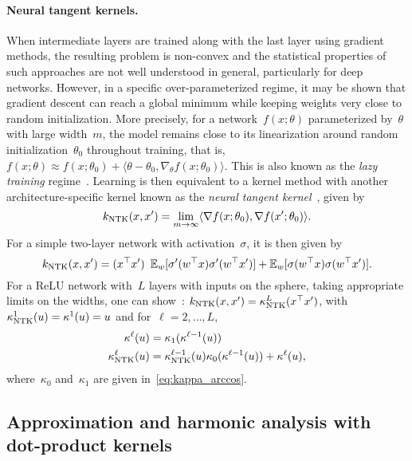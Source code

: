\paragraph{Neural tangent kernels.}
When intermediate layers are trained along with the last layer using gradient methods, the resulting problem is non-convex and the statistical properties of such approaches are not well understood in general, particularly for deep networks.
However, in a specific over-parameterized regime, it may be shown that gradient descent can reach a global minimum while keeping weights very close to random initialization.
More precisely,
for a network~$f(x; \theta)$ parameterized by~$\theta$ with large width~$m$, the model remains close to its linearization around random initialization~$\theta_0$ throughout training, that is,~$f(x; \theta) \approx f(x; \theta_0) + \langle \theta - \theta_0, \nabla_\theta f(x; \theta_0) \rangle$.
This is also known as the \emph{lazy training} regime~\citep{chizat2018note}.
Learning is then equivalent to a kernel method with another architecture-specific kernel known as the \emph{neural tangent kernel}~\citep[NTK,][]{jacot2018neural}, given by
\begin{equation}
k_{{\text{NTK}}}(x, x') = \lim_{m \to \infty} \langle \nabla f(x; \theta_0), \nabla f(x'; \theta_0) \rangle.
\end{equation}
For a simple two-layer network with activation~$\sigma$, it is then given by
\begin{equation}
k_{{\text{NTK}}}(x, x') = (x^\top x') ~\operatorname{\mathbb{E}}_w [\sigma'(w^\top x) \sigma'(w^\top x')] + \operatorname{\mathbb{E}}_w [\sigma(w^\top x) \sigma(w^\top x')].
\end{equation}
For a ReLU network with~$L$ layers with inputs on the sphere, taking appropriate limits on the widths, one can show~\citep{jacot2018neural}: $k_{{\text{NTK}}}(x, x') = \kappa^L_{{\text{NTK}}}(x^\top x')$, with~$\kappa^1_{{\text{NTK}}}(u) = \kappa^1(u) = u$ and for~$\ell = 2, \ldots, L$,
\begin{align}
\kappa^{\ell}(u) &= \kappa_1(\kappa^{\ell-1}(u)) \nonumber \\
\kappa^{\ell}_{{\text{NTK}}}(u) &= \kappa^{\ell-1}_{{\text{NTK}}}(u) \kappa_0(\kappa^{\ell-1}(u)) + \kappa^{\ell}(u), \label{eq:ntk_rec}
\end{align}
where~$\kappa_0$ and~$\kappa_1$ are given in~\eqref{eq:kappa_arccos}.



\subsection{Approximation and harmonic analysis with dot-product kernels}
\label{sub:dp_kernel_approx}

